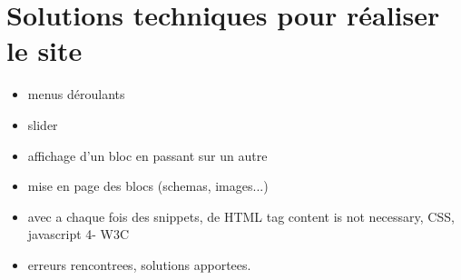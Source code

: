 \documentclass{scrartcl}
\begin{document}
\section{Solutions techniques pour réaliser le site}
\begin{itemize}
\item menus déroulants
\item slider
\item affichage d’un bloc en passant sur un autre
\item mise en page des blocs (schemas, images...)
\item avec a chaque fois des snippets, de HTML tag content is not necessary, CSS, javascript 4- W3C
\item erreurs rencontrees, solutions apportees. 

\end{itemize}
\end{document}
